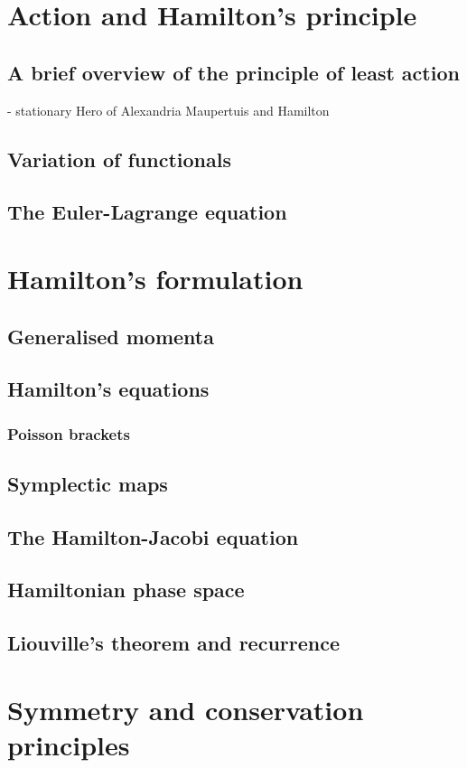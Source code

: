 \chapter{Action and Hamilton's principle}
\section{A brief overview of the principle of least action}
- stationary
Hero of Alexandria
Maupertuis and Hamilton


\section{Variation of functionals}
\section{The Euler-Lagrange equation}


\chapter{Hamilton's formulation}
\section{Generalised momenta}
\section{Hamilton's equations}
\subsection{Poisson brackets}
\section{Symplectic maps}
\section{The Hamilton-Jacobi equation}
\section{Hamiltonian phase space}
\section{Liouville's theorem and recurrence}

\chapter{Symmetry and conservation principles}

